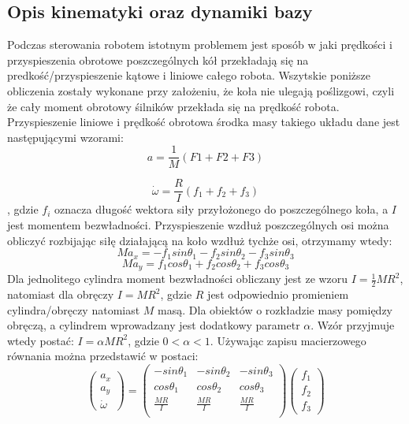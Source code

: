 \subsection{Opis kinematyki oraz dynamiki bazy}
Podczas sterowania robotem istotnym problemem jest sposób w jaki prędkości i przyspieszenia obrotowe poszczególnych kół przekładają się
na predkość/przyspieszenie kątowe i liniowe całego robota. Wszytskie poniższe obliczenia zostały wykonane przy założeniu, że koła nie ulegają poślizgowi,
czyli że cały moment obrotowy śilników przekłada się na prędkość robota.
Przyspieszenie liniowe i prędkość obrotowa środka masy takiego układu dane jest następującymi wzorami:
\begin{equation}
a=\frac{1}{M}(F1+F2+F3)
\end{equation}

\begin{equation}
\dot{ \omega }=\frac{R}{I}(f_1+f_2+f_3)
\end{equation}
, gdzie $f_i$ oznacza długość wektora siły przyłożonego do poszczególnego koła, a $I$  jest momentem bezwładności.
Przyspieszenie wzdłuż poszczególnych osi można obliczyć rozbijając siłę działającą na koło wzdłuż tychże osi, otrzymamy wtedy:
\begin{equation}
Ma_x=-f_1sin\theta_1 - f_2sin\theta_2 - f_3sin\theta_3
\end{equation}
\begin{equation}
Ma_y=f_1cos\theta_1 + f_2cos\theta_2 + f_3cos\theta_3
\end{equation}
Dla jednolitego cylindra moment bezwładności obliczany jest ze wzoru $I=\frac{1}{2}MR^2$, natomiast dla obręczy $I=MR^2$, gdzie $R$ jest odpowiednio promieniem
\mbox{cylindra/obręczy} natomiast $M$ masą. Dla obiektów o rozkładzie masy pomiędzy
obręczą, a cylindrem wprowadzany jest dodatkowy parametr $\alpha$. Wzór przyjmuje wtedy postać: $I=\alpha MR^2$, gdzie $0<\alpha<1$.
Używając zapisu macierzowego równania można przedstawić w postaci:
\begin{equation}
 \begin{pmatrix}
  a_x\\
  a_y\\
  \dot{\omega}
 \end{pmatrix}
  =
\begin{pmatrix}
  -sin\theta_1 & -sin\theta_2 & -sin\theta_3 \\
  cos\theta_1 & cos\theta_2 & cos\theta_3 \\
  \frac{MR}{I} & \frac{MR}{I} & \frac{MR}{I}\\
 \end{pmatrix} 
 \begin{pmatrix}
  f_1\\
  f_2\\
  f_3
 \end{pmatrix}
\end{equation}


